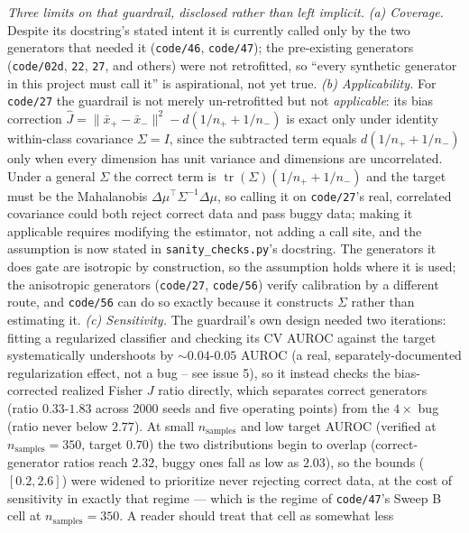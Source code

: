 \documentclass[10pt]{article} %
\begin{document}
\begin{description}
  \emph{Three limits on that guardrail, disclosed rather than left implicit.}
  \emph{(a) Coverage.} Despite its docstring's stated intent it is currently
  called only by the two generators that needed it (\texttt{code/46},
  \texttt{code/47}); the pre-existing generators (\texttt{code/02d},
  \texttt{22}, \texttt{27}, and others) were not retrofitted, so ``every
  synthetic generator in this project must call it'' is aspirational, not yet
  true. \emph{(b) Applicability.} For \texttt{code/27} the guardrail is not
  merely un-retrofitted but not \emph{applicable}: its bias correction
  $\hat J=\lVert\bar x_+-\bar x_-\rVert^2-d(1/n_++1/n_-)$ is exact only under
  identity within-class covariance $\Sigma=I$, since the subtracted term
  equals $d(1/n_++1/n_-)$ only when every dimension has unit variance and
  dimensions are uncorrelated. Under a general $\Sigma$ the correct term is
  $\operatorname{tr}(\Sigma)(1/n_++1/n_-)$ and the target must be the
  Mahalanobis $\Delta\mu^\top\Sigma^{-1}\Delta\mu$, so calling it on
  \texttt{code/27}'s real, correlated covariance could both reject correct data
  and pass buggy data; making it applicable requires modifying the estimator,
  not adding a call site, and the assumption is now stated in
  \texttt{sanity\_checks.py}'s docstring. The generators it does gate are
  isotropic by construction, so the assumption holds where it is used; the
  anisotropic generators (\texttt{code/27}, \texttt{code/56}) verify
  calibration by a different route, and \texttt{code/56} can do so exactly
  because it constructs $\Sigma$ rather than estimating it.
  \emph{(c) Sensitivity.} The guardrail's own design needed two iterations:
  fitting a regularized classifier and checking its CV AUROC against the target
  systematically undershoots by $\sim0.04$-$0.05$ AUROC (a real,
  separately-documented regularization effect, not a bug -- see issue 5), so it
  instead checks the bias-corrected realized Fisher $J$ ratio directly, which
  separates correct generators (ratio $0.33$-$1.83$ across 2000 seeds
  and five operating points) from the $4\times$ bug (ratio never below
  $2.77$). At small $n_{\text{samples}}$ and low target AUROC (verified at
  $n_{\text{samples}}=350$, target $0.70$) the two distributions begin to
  overlap (correct-generator ratios reach $2.32$, buggy ones fall as low as
  $2.03$), so the bounds ($[0.2,2.6]$) were widened to prioritize never
  rejecting correct data, at the cost of sensitivity in exactly that regime ---
  which is the regime of \texttt{code/47}'s Sweep B cell at
  $n_{\text{samples}}=350$. A reader should treat that cell as somewhat less

\end{description}
\end{document}
